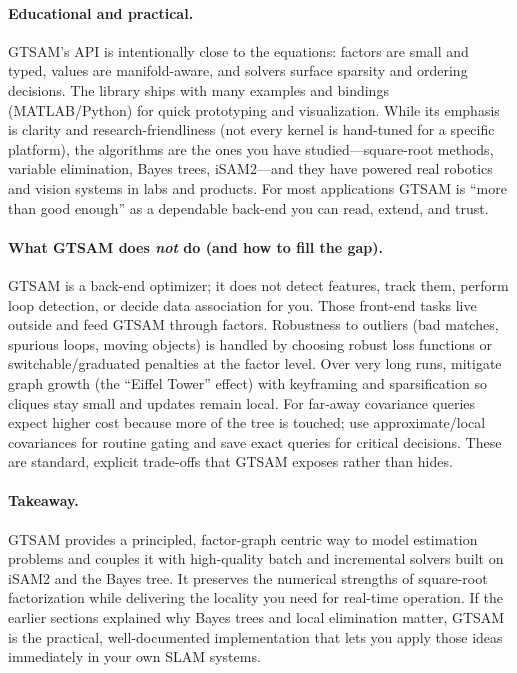 \paragraph{Educational and practical.}
GTSAM’s API is intentionally close to the equations: factors are small and typed, values are manifold-aware, and solvers surface sparsity and ordering decisions. The library ships with many examples and bindings (MATLAB/Python) for quick prototyping and visualization. While its emphasis is clarity and research-friendliness (not every kernel is hand-tuned for a specific platform), the algorithms are the ones you have studied—square-root methods, variable elimination, Bayes trees, iSAM2—and they have powered real robotics and vision systems in labs and products. For most applications GTSAM is “more than good enough” as a dependable back-end you can read, extend, and trust. \cite{GTSAM_handbook,iSAM2_paper,Bayes_tree_for_SLAM_paper}

\paragraph{What GTSAM does \emph{not} do (and how to fill the gap).}
GTSAM is a back-end optimizer; it does not detect features, track them, perform loop detection, or decide data association for you. Those front-end tasks live outside and feed GTSAM through factors. Robustness to outliers (bad matches, spurious loops, moving objects) is handled by choosing robust loss functions or switchable/graduated penalties at the factor level. Over very long runs, mitigate graph growth (the “Eiffel Tower” effect) with keyframing and sparsification so cliques stay small and updates remain local. For far-away covariance queries expect higher cost because more of the tree is touched; use approximate/local covariances for routine gating and save exact queries for critical decisions. These are standard, explicit trade-offs that GTSAM exposes rather than hides. \cite{iSAM2_paper,Bayes_tree_for_SLAM_paper}

\paragraph{Takeaway.}
GTSAM provides a principled, factor-graph centric way to model estimation problems and couples it with high-quality batch and incremental solvers built on iSAM2 and the Bayes tree. It preserves the numerical strengths of square-root factorization while delivering the locality you need for real-time operation. If the earlier sections explained why Bayes trees and local elimination matter, GTSAM is the practical, well-documented implementation that lets you apply those ideas immediately in your own SLAM systems. \cite{GTSAM_handbook,iSAM2_paper,Bayes_tree_for_SLAM_paper}
